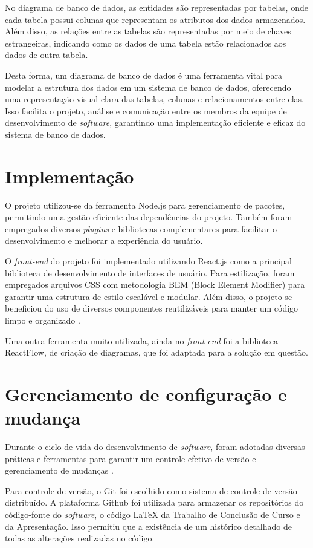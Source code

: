 No diagrama de banco de dados, as entidades são representadas por tabelas, onde cada tabela possui colunas que representam os atributos dos dados armazenados. Além disso, as relações entre as tabelas são representadas por meio de chaves estrangeiras, indicando como os dados de uma tabela estão relacionados aos dados de outra tabela.
            
Desta forma, um diagrama de banco de dados é uma ferramenta vital para modelar a estrutura dos dados em um sistema de banco de dados, oferecendo uma representação visual clara das tabelas, colunas e relacionamentos entre elas. Isso facilita o projeto, análise e comunicação entre os membros da equipe de desenvolvimento de \textit{software}, garantindo uma implementação eficiente e eficaz do sistema de banco de dados.
    
\section{Implementação}

O projeto utilizou-se da ferramenta Node.js para gerenciamento de pacotes, permitindo uma gestão eficiente das dependências do projeto. Também foram empregados diversos \textit{plugins} e bibliotecas complementares para facilitar o desenvolvimento e melhorar a experiência do usuário.

O \textit{front-end} do projeto foi implementado utilizando React.js como a principal biblioteca de desenvolvimento de interfaces de usuário. Para estilização, foram empregados arquivos CSS com metodologia BEM (Block Element Modifier) para garantir uma estrutura de estilo escalável e modular. Além disso, o projeto se beneficiou do uso de diversos componentes reutilizáveis para manter um código limpo e organizado \cite{eloquentjavascript}.

Uma outra ferramenta muito utilizada, ainda no \textit{front-end} foi a biblioteca ReactFlow, de criação de diagramas, que foi adaptada para a solução em questão.
    
\section{Gerenciamento de configuração e mudança}

Durante o ciclo de vida do desenvolvimento de \textit{software}, foram adotadas diversas práticas e ferramentas para garantir um controle efetivo de versão e gerenciamento de mudanças \cite{gitevery}.
    
Para controle de versão, o Git foi escolhido como sistema de controle de versão distribuído. A plataforma Github \cite{github} foi utilizada para armazenar os repositórios do código-fonte do \textit{software}, o código LaTeX da Trabalho de Conclusão de Curso e da Apresentação. Isso permitiu que a existência de um histórico detalhado de todas as alterações realizadas no código.
    
